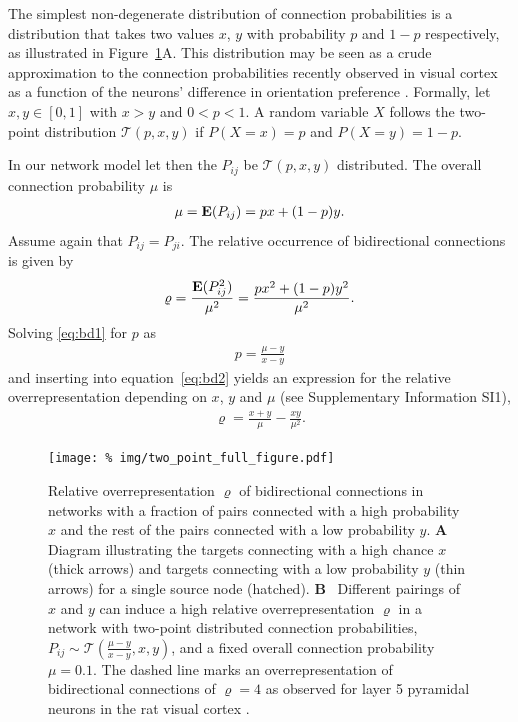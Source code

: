 
The simplest non-degenerate distribution of connection probabilities
is a distribution that takes two values $x$, $y$ with probability $p$
and $1-p$ respectively, as illustrated in Figure~\ref{fig:tp}A. %
%
This distribution may be seen as a crude approximation to the
connection probabilities recently observed in visual cortex as a
function of the neurons' difference in orientation preference
\cite{Lee2016}.
%
Formally, let $x,y \in [0,1]$ with $x > y$ and $0 < p
< 1$. A random variable $X$ follows the two-point distribution 
$\mathcal{T}(p,x,y)$ if $P(X=x)=p$ and $P(X=y) = 1-p$.
%

%
In our network model let then the $P_{ij}$ be $\mathcal{T}(p,x,y)$
distributed. The overall connection probability $\mu$ is
\begin{align}
\mu = \operatorname{\mathbf{E}}(P_{ij}) = px + (1-p)y. \label{eq:bd1}
\end{align}
Assume again that $P_{ij} = P_{ji}$. The relative occurrence of
bidirectional connections is given by
\begin{align}
  \varrho = \frac{\operatorname{\mathbf{E}}(P_{ij}^2)}{\mu^2} = \frac{p x^2 + (1-p) y^2}{\mu^2} \label{eq:bd2}.
\end{align}
Solving \eqref{eq:bd1} for $p$ as
\begin{align}
p = \frac{\mu - y}{x-y}
\end{align}
and inserting into equation~\eqref{eq:bd2} yields an expression for
the relative overrepresentation depending on $x$, $y$ and $\mu$ (see
Supplementary Information SI1),
\begin{align}
\varrho = \frac{x+y}{\mu} - \frac{xy}{\mu^2}.
\end{align}

\begin{figure}[h!]
\centering
\texttt{[image: \%
    img/two\_point\_full\_figure.pdf]}
\caption{Relative overrepresentation $\varrho$ of bidirectional
  connections in networks with a fraction of pairs connected with a
  high probability $x$ and the rest of the pairs connected with a low
  probability $y$. \textbf{A}~ Diagram illustrating the targets
  connecting with a high chance $x$ (thick arrows) and targets
  connecting with a low probability $y$ (thin arrows) for a single
  source node (hatched). \textbf{B}~ Different pairings of $x$ and $y$
  can induce a high relative overrepresentation $\varrho$ in a network
  with two-point distributed connection probabilities, $P_{ij} \sim
  \mathcal{T}(\frac{\mu-y}{x-y},x,y)$, and a fixed overall connection
  probability $\mu = 0.1$. The dashed line marks an overrepresentation
  of bidirectional connections of $\varrho=4$ as observed for layer 5
  pyramidal neurons in the rat visual cortex \cite{Song2005}.}
\label{fig:tp}
\end{figure}

